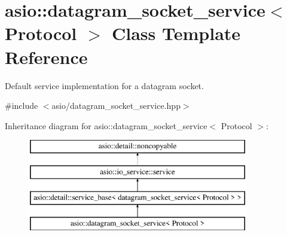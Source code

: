 \hypertarget{classasio_1_1datagram__socket__service}{}\section{asio\+:\+:datagram\+\_\+socket\+\_\+service$<$ Protocol $>$ Class Template Reference}
\label{classasio_1_1datagram__socket__service}


Default service implementation for a datagram socket.  




{\ttfamily \#include $<$asio/datagram\+\_\+socket\+\_\+service.\+hpp$>$}

Inheritance diagram for asio\+:\+:datagram\+\_\+socket\+\_\+service$<$ Protocol $>$\+:\begin{figure}[H]
\begin{center}
\leavevmode
\includegraphics[height=4.000000cm]{classasio_1_1datagram__socket__service}
\end{center}
\end{figure}
